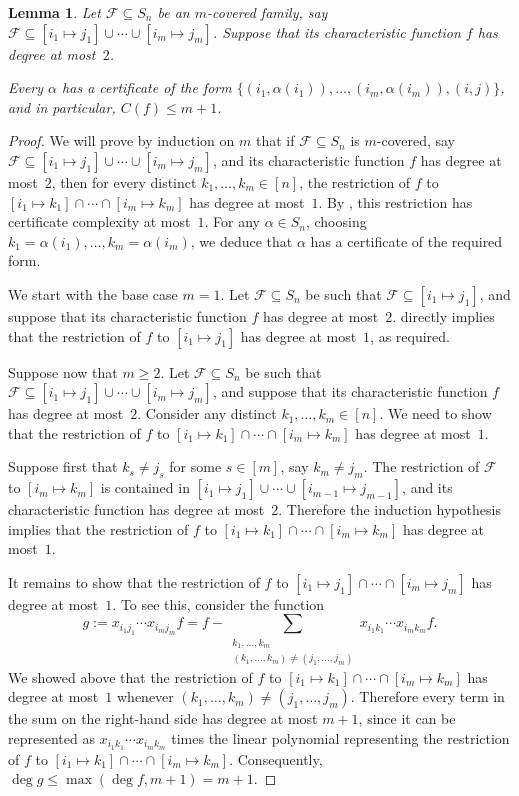\documentclass{article}
\newtheorem{lemma}[theorem]{Lemma}
\theoremstyle{definition}
\providecommand{\coset}[2]{[#1 \mapsto #2]}
\begin{document}
\begin{lemma} \label{lem:structure-sym}
Let $\mathcal{F} \subseteq S_n$ be an $m$-covered family, say $\mathcal{F} \subseteq \coset{i_1}{j_1} \cup \cdots \cup \coset{i_m}{j_m}$. Suppose that its characteristic function $f$ has degree at most~$2$.

Every $\alpha$ has a certificate of the form $\{(i_1,\alpha(i_1)),\ldots,(i_m,\alpha(i_m)),(i,j)\}$, and in particular, $C(f) \leq m + 1$.
\end{lemma}
\begin{proof}
We will prove by induction on $m$ that if $\mathcal{F} \subseteq S_n$ is $m$-covered, say $\mathcal{F} \subseteq \coset{i_1}{j_1} \cup \cdots \cup \coset{i_m}{j_m}$, and its characteristic function $f$ has degree at most~$2$, then for every distinct $k_1,\ldots,k_m \in [n]$, the restriction of $f$ to $\coset{i_1}{k_1} \cap \cdots \cap \coset{i_m}{k_m}$ has degree at most~$1$. By , this restriction has certificate complexity at most~$1$. For any $\alpha \in S_n$, choosing $k_1 = \alpha(i_1),\ldots,k_m = \alpha(i_m)$, we deduce that $\alpha$ has a certificate of the required form.

We start with the base case $m = 1$. Let $\mathcal{F} \subseteq S_n$ be such that $\mathcal{F} \subseteq \coset{i_1}{j_1}$, and suppose that its characteristic function $f$ has degree at most~$2$.  directly implies that the restriction of $f$ to $\coset{i_1}{j_1}$ has degree at most~$1$, as required.

Suppose now that $m \geq 2$. Let $\mathcal{F} \subseteq S_n$ be such that $\mathcal{F} \subseteq \coset{i_1}{j_1} \cup \cdots \cup \coset{i_m}{j_m}$, and suppose that its characteristic function $f$ has degree at most~$2$. Consider any distinct $k_1,\ldots,k_m \in [n]$. We need to show that the restriction of $f$ to $\coset{i_1}{k_1} \cap \cdots \cap \coset{i_m}{k_m}$ has degree at most~$1$.

Suppose first that $k_s \neq j_s$ for some $s \in [m]$, say $k_m \neq j_m$. The restriction of $\mathcal{F}$ to $\coset{i_m}{k_m}$ is contained in $\coset{i_1}{j_1} \cup \cdots \cup \coset{i_{m-1}}{j_{m-1}}$, and its characteristic function has degree at most~$2$. Therefore the induction hypothesis implies that the restriction of $f$ to $\coset{i_1}{k_1} \cap \cdots \cap \coset{i_m}{k_m}$ has degree at most~$1$.

It remains to show that the restriction of $f$ to $\coset{i_1}{j_1} \cap \cdots \cap \coset{i_m}{j_m}$ has degree at most~$1$. To see this, consider the function
\[
 g := x_{i_1j_1} \cdots x_{i_mj_m} f = f - \sum_{\substack{k_1,\ldots,k_m \\ (k_1,\ldots,k_m) \neq (j_1,\ldots,j_m)}} x_{i_1k_1} \cdots x_{i_mk_m} f.
\]
We showed above that the restriction of $f$ to $\coset{i_1}{k_1} \cap \cdots \cap \coset{i_m}{k_m}$ has degree at most~$1$ whenever $(k_1,\ldots,k_m) \neq (j_1,\ldots,j_m)$. Therefore every term in the sum on the right-hand side has degree at most $m+1$, since it can be represented as $x_{i_1k_1} \cdots x_{i_mk_m}$ times the linear polynomial representing the restriction of $f$ to $\coset{i_1}{k_1} \cap \cdots \cap \coset{i_m}{k_m}$. Consequently, $\deg g \leq \max(\deg f, m+1) = m+1$.


\end{proof}
\end{document}
